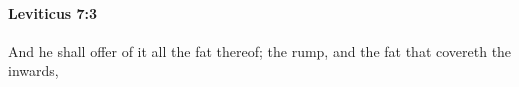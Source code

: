 
		\paragraph{Leviticus 7:3} %
			\label{LEVITICUS-7-3}

			And he shall offer of it all the fat thereof; the rump, and the fat that covereth the inwards,


